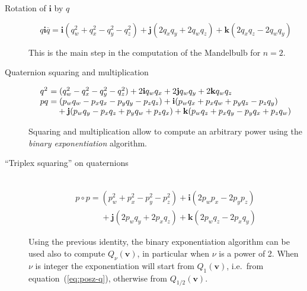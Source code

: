 \documentclass{article}
\let\vec\mathbf
\let\bar\overline
\newcommand{\mathnewlineeq}[1][\quad]{\\\phantom{#1 = }}
\begin{document}
\begin{description}
\item[Rotation of $\vec{i}$ by $q$]
\begin{equation*}
q\vec{i}\bar q =
  \vec{i}(q_w^2+q_x^2-q_y^2-q_z^2) + \vec{j} (2q_x q_y + 2q_w q_z)
  + \vec{k} (2 q_x q_z - 2 q_w q_y)
\end{equation*}

\noindent This is the main step in the computation of the Mandelbulb
for $n=2$.

\bigskip
\item[Quaternion squaring and multiplication]
\begin{equation*}
\begin{array}{l}
\hbox to 0pt{$q^2\hss$}\phantom{p q} =
  (q_w^2-q_x^2-q_y^2-q_z^2) + 2 \vec{i} q_w q_x + 2 \vec{j} q_w q_y
  + 2 \vec{k} q_w q_z\\
p q =       (p_w q_w - p_x q_x - p_y q_y - p_z q_z)
  + \vec{i} (p_w q_x + p_x q_w + p_y q_z - p_z q_y) \mathnewlineeq[p q]
  + \vec{j} (p_w q_y - p_x q_z + p_y q_w + p_z q_x)
  + \vec{k} (p_w q_z + p_x q_y - p_y q_x + p_z q_w)
\end{array}
\end{equation*}

\noindent
Squaring and multiplication allow to compute an arbitrary power using
the \emph{binary exponentiation} algorithm.

\bigskip
\item[``Triplex squaring'' on quaternions] ~\\
\begin{equation*}
\begin{array}{l}
p \circ p =
    (p_w^2 + p_x^2 - p_y^2 - p_z^2) + \vec{i} (2 p_w p_x - 2 p_y p_z)
\mathnewlineeq[p \circ p]
  + \vec{j} (2 p_w q_y + 2 p_x q_z) + \vec{k} (2 p_w q_z - 2 p_x q_y)
\end{array}
\end{equation*}

Using the previous identity, the binary exponentiation algorithm can
be used also to compute $Q_\nu(\vec{v})$, in particular when $\nu$ is a
power of 2.  When $\nu$ is integer the exponentiation will start
from $Q_1(\vec{v})$, i.e.~from equation~(\ref{eq:posz-q}),
otherwise from $Q_{1/2}(\vec{v})$.


\end{description}
\end{document}
